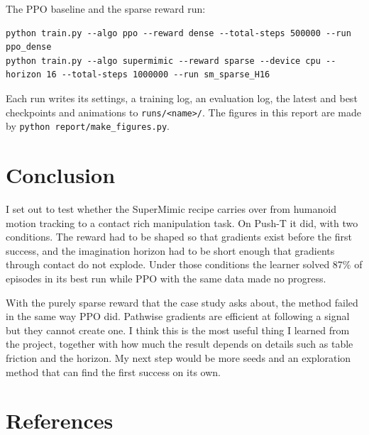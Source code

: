 \documentclass[11pt,a4paper]{article}
\begin{document}
The PPO baseline and the sparse reward run:

\begin{lstlisting}
python train.py --algo ppo --reward dense --total-steps 500000 --run ppo_dense
python train.py --algo supermimic --reward sparse --device cpu --horizon 16 --total-steps 1000000 --run sm_sparse_H16
\end{lstlisting}

Each run writes its settings, a training log, an evaluation log, the latest and best checkpoints and
animations to \texttt{runs/<name>/}. The figures in this report are made by
\texttt{python report/make\_figures.py}.

\section{Conclusion}
\label{sec:conclusion}

I set out to test whether the SuperMimic recipe carries over from humanoid motion tracking to a
contact rich manipulation task. On Push-T it did, with two conditions. The reward had to be shaped
so that gradients exist before the first success, and the imagination horizon had to be short enough
that gradients through contact do not explode. Under those conditions the learner solved 87\% of
episodes in its best run while PPO with the same data made no progress.

With the purely sparse reward that the case study asks about, the method failed in the same way PPO
did. Pathwise gradients are efficient at following a signal but they cannot create one. I think this
is the most useful thing I learned from the project, together with how much the result depends on
details such as table friction and the horizon. My next step would be more seeds and an exploration
method that can find the first success on its own.

\clearpage
\section*{References}
\end{document}
